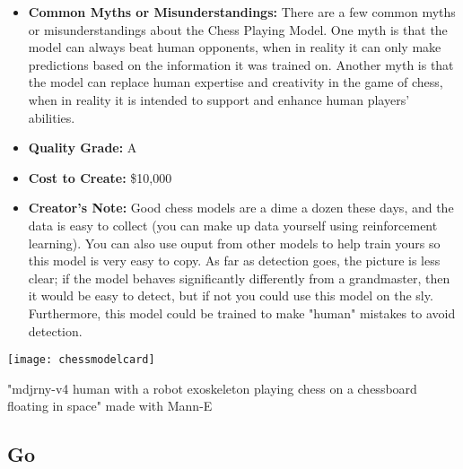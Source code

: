 \begin{itemize}
    \item \textbf{Common Myths or Misunderstandings:} There are a few common myths or misunderstandings about the Chess Playing Model. One myth is that the model can always beat human opponents, when in reality it can only make predictions based on the information it was trained on. Another myth is that the model can replace human expertise and creativity in the game of chess, when in reality it is intended to support and enhance human players' abilities. 
    \item \textbf{Quality Grade:} A
    \item \textbf{Cost to Create:} \$10,000
    \item \textbf{Creator's Note:} Good chess models are a dime a dozen these days, and the data is easy to collect (you can make up data yourself using reinforcement learning). You can also use ouput from other models to help train yours so this model is very easy to copy. As far as detection goes, the picture is less clear; if the model behaves significantly differently from a grandmaster, then it would be easy to detect, but if not you could use this model on the sly. Furthermore, this model could be trained to make "human" mistakes to avoid detection. 
\end{itemize}

\begin{pdf}
\begin{marginfigure}[-5.5cm]
        \texttt{[image: chessmodelcard]}
        \caption{"mdjrny-v4 human with a robot exoskeleton playing chess on a chessboard floating in space" made with Mann-E}
\end{marginfigure}
\end{pdf}

\subsection{Go}

